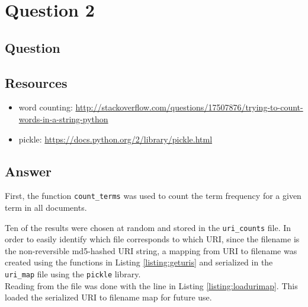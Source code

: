 \section{Question 2}

\subsection{Question}


\subsection{Resources}
\begin{itemize}
\item word counting: \url{http://stackoverflow.com/questions/17507876/trying-to-count-words-in-a-string-python}
\item pickle: \url{https://docs.python.org/2/library/pickle.html}
\end{itemize}

\subsection{Answer}
First, the function {\tt count\_terms} was used to count the term frequency for a given term in all documents.

\newpage


Ten of the results were chosen at random and stored in the {\tt uri\_counts} file. In order to easily identify which file corresponds to which URI, since the filename is the non-reversible md5-hashed URI string, a mapping from URI to filename was created using the functions in Listing \ref{listing:geturis} and serialized in the {\tt uri\_map} file using the {\tt pickle} library.\\



Reading from the file was done with the line in Listing \ref{listing:loadurimap}. This loaded the serialized URI to filename map for future use.\\



